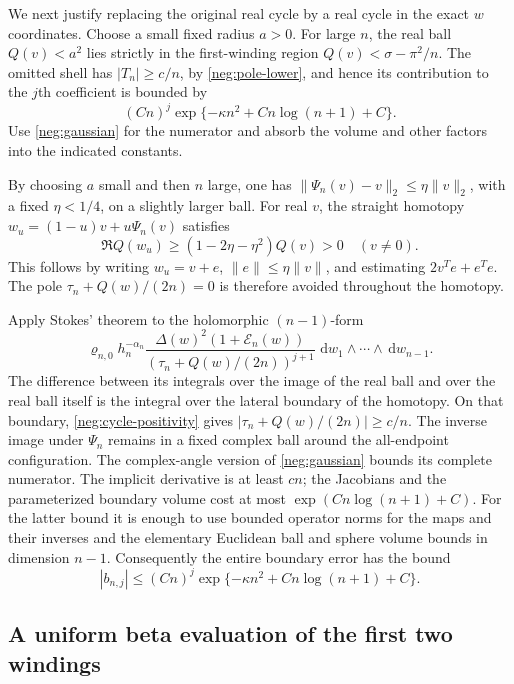 \documentclass[11pt]{article}
\numberwithin{equation}{section}
\theoremstyle{definition}
\newcommand{\dd}{\,\mathrm d}
\begin{document}
We next justify replacing the original real cycle by a real
cycle in the exact \(w\) coordinates.  Choose a small fixed
radius \(a>0\).  For large \(n\), the real ball \(Q(v)<a^2\)
lies strictly in the first-winding region
\(Q(v)<\sigma-\pi^2/n\).  The omitted shell has
\(|T_n|\ge c/n\), by \eqref{neg:pole-lower}, and hence its
contribution to the \(j\)th coefficient is bounded by
\[
 (Cn)^j\exp\{-\kappa n^2+C n\log(n+1)+C\}.
 \]
Use \eqref{neg:gaussian} for the numerator and absorb the
volume and other factors into the indicated constants.

By choosing \(a\) small and then \(n\) large, one has
\(\|\Psi_n(v)-v\|_2\le\eta\|v\|_2\), with a fixed
\(\eta<1/4\), on a slightly larger ball.  For real \(v\),
the straight homotopy
\(w_u=(1-u)v+u\Psi_n(v)\) satisfies
\begin{equation}
 \Re Q(w_u)\ge(1-2\eta-\eta^2)Q(v)>0
                    \quad(v\ne0).
 \label{neg:cycle-positivity}
\end{equation}
This follows by writing \(w_u=v+e\),
\(\|e\|\le\eta\|v\|\), and estimating
\(2v^Te+e^Te\).  The pole
\(\tau_n+Q(w)/(2n)=0\) is therefore avoided throughout
the homotopy.

Apply Stokes' theorem to the holomorphic \((n-1)\)-form
\[
 \varrho_{n,0}h_n^{-\alpha_n}
 \frac{\Delta(w)^2(1+\mathcal E_n(w))}
      {(\tau_n+Q(w)/(2n))^{j+1}}
       \,\dd w_1\wedge\cdots\wedge\dd w_{n-1}.
 \]
The difference between its integrals over the image of the
real ball and over the real ball itself is the integral over
the lateral boundary of the homotopy.  On that boundary,
\eqref{neg:cycle-positivity} gives
\(|\tau_n+Q(w)/(2n)|\ge c/n\).
The inverse image under \(\Psi_n\) remains in a fixed
complex ball around the all-endpoint configuration.  The
complex-angle version of \eqref{neg:gaussian} bounds its
complete numerator.  The implicit derivative is at least
\(cn\); the Jacobians and the parameterized boundary volume
cost at most \(\exp(Cn\log(n+1)+C)\).
For the latter bound it is enough to use bounded operator
norms for the maps and their inverses and the elementary
Euclidean ball and sphere volume bounds in dimension \(n-1\).
Consequently the entire boundary error has the bound
\begin{equation}
 |b_{n,j}|\le
 (Cn)^j\exp\{-\kappa n^2+C n\log(n+1)+C\}.
 \label{neg:cycle-error}
\end{equation}

\subsection{A uniform beta evaluation of the first two windings}
\label{neg:beta-evaluation}
\end{document}
